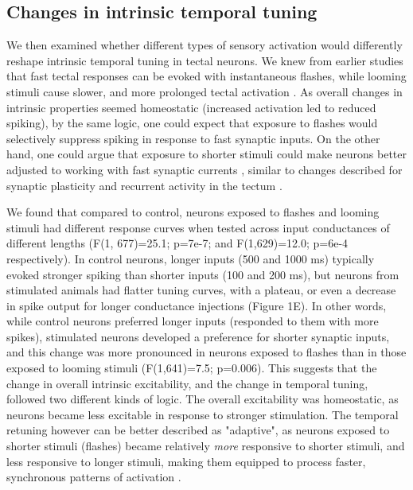 \documentclass{article}
\begin{document}
\subsection*{Changes in intrinsic temporal tuning}

We then examined whether different types of sensory activation would differently reshape intrinsic temporal tuning in tectal neurons. We knew from earlier studies that fast tectal responses can be evoked with instantaneous flashes, while looming stimuli cause slower, and more prolonged tectal activation \citep{khakhalin2014, khakhalin2019graph}. As overall changes in intrinsic properties seemed homeostatic (increased activation led to reduced spiking), by the same logic, one could expect that exposure to flashes would selectively suppress spiking in response to fast synaptic inputs. On the other hand, one could argue that exposure to shorter stimuli could make neurons better adjusted to working with fast synaptic currents \citep{stemmler1999information}, similar to changes described for synaptic plasticity \citep{aizenman2007} and recurrent activity in the tectum \citep{pratt2007, shen2011}.

We found that compared to control, neurons exposed to flashes and looming stimuli had different response curves when tested across input conductances of different lengths (F(1, 677)=25.1; p=7e-7; and F(1,629)=12.0; p=6e-4 respectively). In control neurons, longer inputs (500 and 1000 ms) typically evoked stronger spiking than shorter inputs (100 and 200 ms), but neurons from stimulated animals had flatter tuning curves, with a plateau, or even a decrease in spike output for longer conductance injections (Figure 1E). In other words, while control neurons preferred longer inputs (responded to them with more spikes), stimulated neurons developed a preference for shorter synaptic inputs, and this change was more pronounced in neurons exposed to flashes than in those exposed to looming stimuli (F(1,641)=7.5; p=0.006). This suggests that the change in overall intrinsic excitability, and the change in temporal tuning, followed two different kinds of logic. The overall excitability was homeostatic, as neurons became less excitable in response to stronger stimulation. The temporal retuning however can be better described as "adaptive", as neurons exposed to shorter stimuli (flashes) became relatively \textit{more} responsive to shorter stimuli, and less responsive to longer stimuli, making them equipped to process faster, synchronous patterns of activation \citep{stemmler1999information, fontaine2014threshold}.
\end{document}
